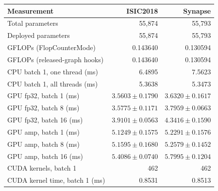 \begin{tabular}{lrr}
\toprule
Measurement & ISIC2018 & Synapse \\
\midrule
Total parameters & 55,874 & 55,793 \\
Deployed parameters & 55,874 & 55,793 \\
GFLOPs (FlopCounterMode) & 0.143640 & 0.130594 \\
GFLOPs (released-graph hooks) & 0.143640 & 0.130594 \\
CPU batch 1, one thread (ms) & 6.4895 & 7.5623 \\
CPU batch 1, all threads (ms) & 5.3638 & 5.3473 \\
GPU fp32, batch 1 (ms) & $3.5603 \pm 0.1790$ & $3.6320 \pm 0.1617$ \\
GPU fp32, batch 8 (ms) & $3.5775 \pm 0.1171$ & $3.7959 \pm 0.0663$ \\
GPU fp32, batch 16 (ms) & $3.9101 \pm 0.0563$ & $4.3416 \pm 0.1590$ \\
GPU amp, batch 1 (ms) & $5.1249 \pm 0.1575$ & $5.2291 \pm 0.1576$ \\
GPU amp, batch 8 (ms) & $5.1595 \pm 0.1680$ & $5.2579 \pm 0.1452$ \\
GPU amp, batch 16 (ms) & $5.4086 \pm 0.0740$ & $5.7995 \pm 0.1204$ \\
CUDA kernels, batch 1 & 462 & 462 \\
CUDA kernel time, batch 1 (ms) & 0.8531 & 0.8513 \\
\bottomrule
\end{tabular}
